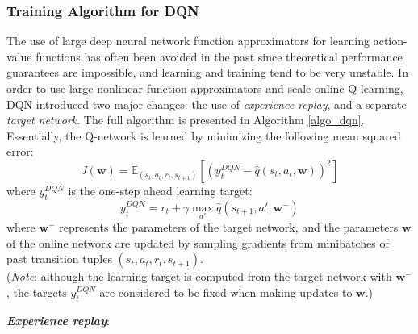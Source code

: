 \documentclass{article}
\newcommand{\E}{\mathbb{E}}                                        %
\newcommand{\w}{\mathbf{w}}
\begin{document}
\subsubsection{Training Algorithm for DQN}

The use of large deep neural network function approximators for learning action-value functions has often been avoided in the past since theoretical performance guarantees are impossible, and learning and training tend to be very unstable. In order to use large nonlinear function approximators and scale online Q-learning, DQN introduced two major changes: the use of \textit{experience replay}, and a separate \textit{target network}. The full algorithm is presented in Algorithm \ref{algo_dqn}. Essentially, the Q-network is learned by minimizing the following mean squared error:
\begin{equation} \label{mse_dqn}
   J(\mathbf{w}) = \E_{(s_t,a_t,r_t,s_{t+1})}[(y_t^{DQN} - \hat{q}(s_t,a_t, \w) )^2]
\end{equation}
where $y_t^{DQN}$ is the one-step ahead learning target:
\begin{equation} \label{target_dqn}
   y_t^{DQN} = r_t + \gamma \max_{a'} \hat{q}(s_{t+1},   a', \w^-)
\end{equation}
where $\w^-$ represents the parameters of the target network, and the parameters $\w$ of the online network are updated by sampling gradients from minibatches of past transition tuples $(s_t,a_t,r_t,s_{t+1})$. \\ (\textit{Note}: although the learning target is computed from the target network with $\w^-$, the targets $y_t^{DQN}$ are considered to be fixed when making updates to $\w$.)

\textbf{\textit{Experience replay}}:
\end{document}

